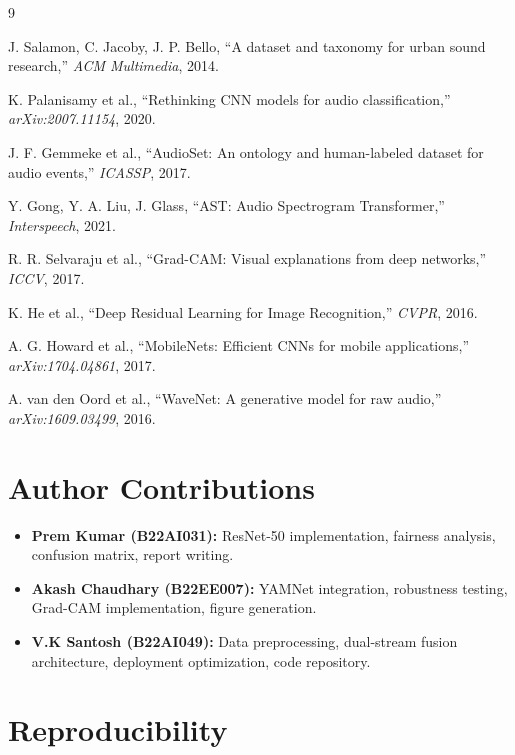 \documentclass[11pt,a4paper]{article}
\begin{document}
\newpage

\begin{thebibliography}{9}

J. Salamon, C. Jacoby, J. P. Bello, ``A dataset and taxonomy for urban sound research,'' \textit{ACM Multimedia}, 2014.

K. Palanisamy et al., ``Rethinking CNN models for audio classification,'' \textit{arXiv:2007.11154}, 2020.

J. F. Gemmeke et al., ``AudioSet: An ontology and human-labeled dataset for audio events,'' \textit{ICASSP}, 2017.

Y. Gong, Y. A. Liu, J. Glass, ``AST: Audio Spectrogram Transformer,'' \textit{Interspeech}, 2021.

R. R. Selvaraju et al., ``Grad-CAM: Visual explanations from deep networks,'' \textit{ICCV}, 2017.

K. He et al., ``Deep Residual Learning for Image Recognition,'' \textit{CVPR}, 2016.

A. G. Howard et al., ``MobileNets: Efficient CNNs for mobile applications,'' \textit{arXiv:1704.04861}, 2017.

A. van den Oord et al., ``WaveNet: A generative model for raw audio,'' \textit{arXiv:1609.03499}, 2016.

\end{thebibliography}

\appendix
\section{Author Contributions}

\begin{itemize}[noitemsep]
    \item \textbf{Prem Kumar (B22AI031):} ResNet-50 implementation, fairness analysis, confusion matrix, report writing.
    \item \textbf{Akash Chaudhary (B22EE007):} YAMNet integration, robustness testing, Grad-CAM implementation, figure generation.
    \item \textbf{V.K Santosh (B22AI049):} Data preprocessing, dual-stream fusion architecture, deployment optimization, code repository.
\end{itemize}

\section{Reproducibility}
\end{document}
